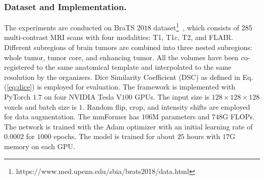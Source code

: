 \documentclass[runningheads]{llncs}
\begin{document}
\subsubsection{Dataset and Implementation.} The experiments are conducted on BraTS $2018$ dataset\footnote{https://www.med.upenn.edu/sbia/brats2018/data.html}~\cite{menze2014multimodal}, which consists of 285 multi-contrast MRI scans with four modalities: T1, T1c, T2, and FLAIR. 
Different subregions of brain tumors are combined into three nested subregions: whole tumor, tumor core, and enhancing tumor. All the volumes have been co-registered to the same anatomical template and interpolated to the same resolution by the organizers. Dice Similarity Coefficient (DSC) as defined in Eq. (\ref{eq:dice}) is employed for evaluation.
The framework is implemented with PyTorch $1.7$ on four NVIDIA Tesla V$100$ GPUs. The input size is $128 \times 128 \times 128$ voxels and batch size is $1$. Random flip, crop, and intensity shifts are employed for data augmentation. The mmFormer has $106$M parameters and $748$G FLOPs. The network is trained with the Adam optimizer with an initial learning rate of $0.0002$ for $1000$ epochs. The model is trained for about $25$ hours with $17$G memory on each GPU. 
\end{document}
